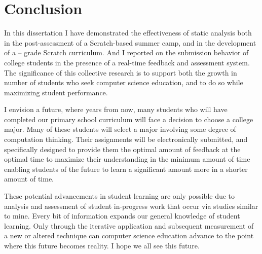 \chapter{Conclusion} \label{chap:conclusion}

In this dissertation I have demonstrated the effectiveness of static analysis
both in the post-assessment of a Scratch-based summer camp, and in the
development of a -- grade Scratch curriculum. And I reported on
the submission behavior of college students in the presence of a real-time
feedback and assessment system. The significance of this collective research is
to support both the growth in number of students who seek computer science
education, and to do so while maximizing student performance.

I envision a future, where years from now, many students who will have
completed our primary school curriculum will face a decision to choose a
college major. Many of these students will select a major involving some degree
of computation thinking. Their assignments will be electronically submitted,
and specifically designed to provide them the optimal amount of feedback at the
optimal time to maximize their understanding in the minimum amount of time
enabling students of the future to learn a significant amount more in a shorter
amount of time.

These potential advancements in student learning are only possible due to
analysis and assessment of student in-progress work that occur via studies
similar to mine. Every bit of information expands our general knowledge of
student learning. Only through the iterative application and subsequent
measurement of a new or altered technique can computer science education
advance to the point where this future becomes reality. I hope we all see this
future.
